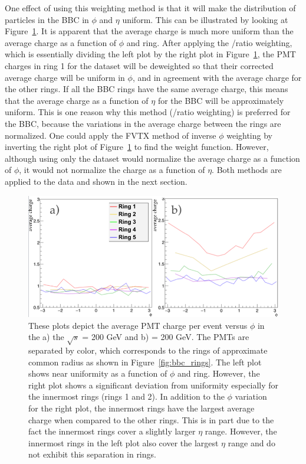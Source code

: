 One effect of using this weighting method is that it will make the distribution of particles in the BBC in $\phi$ and $\eta $ uniform. This can be illustrated by looking at Figure~\ref{fig:bbc_pmt_phi_pp_pau}. It is apparent that the \pp average charge is much more uniform than the \pau average charge as a function of $\phi$ and ring. After applying the \pp/\pau ratio weighting, which is essentially dividing the left plot by the right plot in Figure~\ref{fig:bbc_pmt_phi_pp_pau}, the PMT charges in ring 1 for the \pau dataset will be deweighted so that their corrected average charge will be uniform in $\phi$, and in agreement with the average charge for the other rings. If all the BBC rings have the same average charge, this means that the average charge as a function of $\eta$ for the BBC will be approximately uniform. This is one reason why this method (\pp/\pau ratio weighting) is preferred for the BBC, because the variations in the average charge between the rings are normalized. One could apply the FVTX method of inverse $\phi$ weighting by inverting the right plot of Figure~\ref{fig:bbc_pmt_phi_pp_pau} to find the weight function. However, although using only the \pau dataset would normalize the average charge as a function of $\phi$, it would not normalize the charge as a function of $\eta$. Both methods are applied to the data and shown in the next section.

\begin{figure}[!ht]
\begin{center}
\includegraphics[width=0.75\linewidth]{figs/pp_pau_bbc_comparison.png}
\caption{These plots depict the average PMT charge per event versus $\phi$ in the a) the \pp $\sqrt{s}$ = 200 GeV and b) \pau \sqsn = 200 GeV. The PMTs are separated by color, which corresponds to the rings of approximate common radius as shown in Figure~\ref{fig:bbc_rings}. The left plot shows near uniformity as a function of $\phi$ and ring. However, the right plot shows a significant deviation from uniformity especially for the innermost rings (rings 1 and 2). In addition to the $\phi$ variation for the right plot, the innermost rings have the largest average charge when compared to the other rings. This is in part due to the fact the innermost rings cover a slightly larger $\eta$ range. However, the innermost rings in the left plot also cover the largest $\eta$ range and do not exhibit this separation in rings. }
\label{fig:bbc_pmt_phi_pp_pau}
\end{center}
\end{figure}

